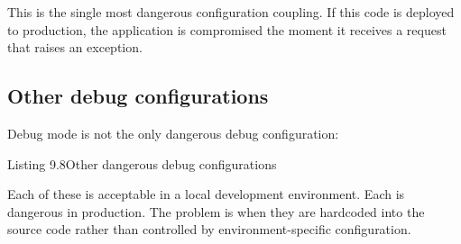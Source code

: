 \noindent{}This is the single most dangerous configuration coupling. If this code is deployed to production, the application is compromised the moment it receives a request that raises an exception.

\subsection*{Other debug configurations}\label{09-configuration-coupling:other-debug-configurations}

Debug mode is not the only dangerous debug configuration:

\begin{codeboxcap}[short]{\textcolor{accent}{Listing 9.8}\enspace Other dangerous debug configurations}

\begin{Shaded}
\begin{Highlighting}[]
\NormalTok{app.config[}\NormalTok{] }\OperatorTok{=}   

\NormalTok{app.config[}\NormalTok{] }\OperatorTok{=} 

\NormalTok{app.config[}\NormalTok{] }\OperatorTok{=} 

\OperatorTok{=}

\OperatorTok{=}\NormalTok{)  }
\end{Highlighting}
\end{Shaded}

\end{codeboxcap}

\noindent{}Each of these is acceptable in a local development environment. Each is dangerous in production. The problem is when they are hardcoded into the source code rather than controlled by environment-specific configuration.

